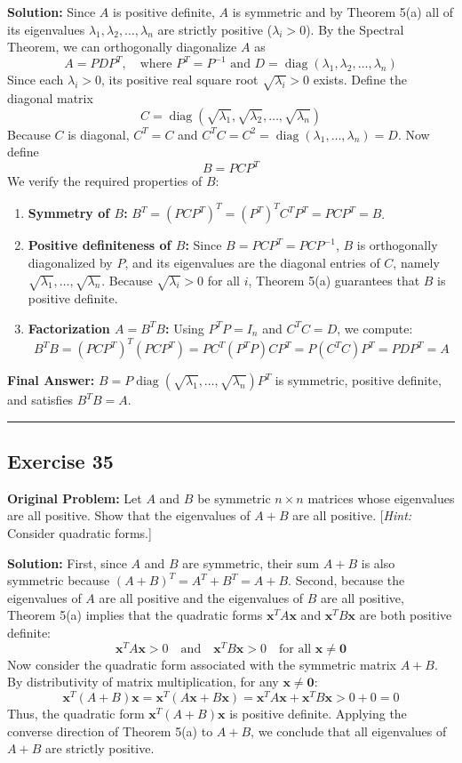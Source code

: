 \documentclass[11pt, letterpaper]{article}
\theoremstyle{definition}
\theoremstyle{remark}
\begin{document}
\textbf{Solution:}
Since $A$ is positive definite, $A$ is symmetric and by Theorem 5(a) all of its eigenvalues $\lambda_1, \lambda_2, \dots, \lambda_n$ are strictly positive ($\lambda_i > 0$). By the Spectral Theorem, we can orthogonally diagonalize $A$ as
\[
A = P D P^T, \quad \text{where } P^T = P^{-1} \text{ and } D = \operatorname{diag}(\lambda_1, \lambda_2, \dots, \lambda_n)
\]
Since each $\lambda_i > 0$, its positive real square root $\sqrt{\lambda_i} > 0$ exists. Define the diagonal matrix
\[
C = \operatorname{diag}\left(\sqrt{\lambda_1}, \sqrt{\lambda_2}, \dots, \sqrt{\lambda_n}\right)
\]
Because $C$ is diagonal, $C^T = C$ and $C^T C = C^2 = \operatorname{diag}(\lambda_1, \dots, \lambda_n) = D$. Now define
\[
B = P C P^T
\]
We verify the required properties of $B$:
\begin{enumerate}
    \item \textbf{Symmetry of $B$:} $B^T = (P C P^T)^T = (P^T)^T C^T P^T = P C P^T = B$.
    \item \textbf{Positive definiteness of $B$:} Since $B = P C P^T = P C P^{-1}$, $B$ is orthogonally diagonalized by $P$, and its eigenvalues are the diagonal entries of $C$, namely $\sqrt{\lambda_1}, \dots, \sqrt{\lambda_n}$. Because $\sqrt{\lambda_i} > 0$ for all $i$, Theorem 5(a) guarantees that $B$ is positive definite.
    \item \textbf{Factorization $A = B^T B$:} Using $P^T P = I_n$ and $C^T C = D$, we compute:
    \[
    B^T B = (P C P^T)^T (P C P^T) = P C^T (P^T P) C P^T = P (C^T C) P^T = P D P^T = A
    \]
\end{enumerate}
\textbf{Final Answer:} $B = P \operatorname{diag}(\sqrt{\lambda_1}, \dots, \sqrt{\lambda_n}) P^T$ is symmetric, positive definite, and satisfies $B^T B = A$.

\medskip\hrule\medskip

\subsection*{Exercise 35}
\textbf{Original Problem:} Let $A$ and $B$ be symmetric $n \times n$ matrices whose eigenvalues are all positive. Show that the eigenvalues of $A + B$ are all positive. [\textit{Hint:} Consider quadratic forms.]

\textbf{Solution:}
First, since $A$ and $B$ are symmetric, their sum $A + B$ is also symmetric because $(A + B)^T = A^T + B^T = A + B$.
Second, because the eigenvalues of $A$ are all positive and the eigenvalues of $B$ are all positive, Theorem 5(a) implies that the quadratic forms $\mathbf{x}^T A \mathbf{x}$ and $\mathbf{x}^T B \mathbf{x}$ are both positive definite:
\[
\mathbf{x}^T A \mathbf{x} > 0 \quad \text{and} \quad \mathbf{x}^T B \mathbf{x} > 0 \quad \text{for all } \mathbf{x} \neq \mathbf{0}
\]
Now consider the quadratic form associated with the symmetric matrix $A + B$. By distributivity of matrix multiplication, for any $\mathbf{x} \neq \mathbf{0}$:
\[
\mathbf{x}^T (A + B) \mathbf{x} = \mathbf{x}^T (A\mathbf{x} + B\mathbf{x}) = \mathbf{x}^T A \mathbf{x} + \mathbf{x}^T B \mathbf{x} > 0 + 0 = 0
\]
Thus, the quadratic form $\mathbf{x}^T (A + B) \mathbf{x}$ is positive definite. Applying the converse direction of Theorem 5(a) to $A + B$, we conclude that all eigenvalues of $A + B$ are strictly positive.
\end{document}
